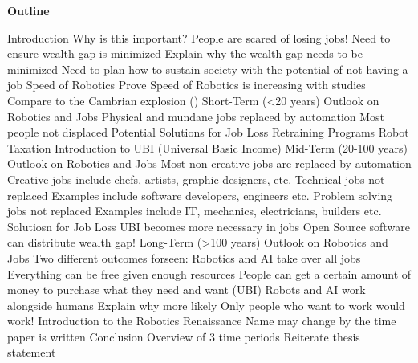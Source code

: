 \documentclass[12pt,letterpaper,man,natbib]{apa6}
\begin{document}
    \pagebreak
    \textbf{Outline}
    \begin{outline}[enumerate]
        \1 Introduction
            \2 Why is this important?
                \3 People are scared of losing jobs!
                \3 Need to ensure wealth gap is minimized
                    \4 Explain why the wealth gap needs to be minimized
                \3 Need to plan how to sustain society with the potential of not having a job
            \2 Speed of Robotics
                \3 Prove Speed of Robotics is increasing with studies
                \3 Compare to the Cambrian explosion (\cite{Cambrian})
        \1 Short-Term (<20 years)
            \2 Outlook on Robotics and Jobs
                \3 Physical and mundane jobs replaced by automation
                \3 Most people not displaced
            \2 Potential Solutions for Job Loss
                \3 Retraining Programs
                \3 Robot Taxation
                \3 Introduction to UBI (Universal Basic Income)
        \1 Mid-Term (20-100 years)
            \2 Outlook on Robotics and Jobs 
                \3 Most non-creative jobs are replaced by automation
                    \4 Creative jobs include chefs, artists, graphic designers, etc.
                \3 Technical jobs not replaced
                    \4 Examples include software developers, engineers etc.
                \3 Problem solving jobs not replaced
                    \4 Examples include IT, mechanics, electricians, builders etc.
            \2 Solutiosn for Job Loss
                \3 UBI becomes more necessary in jobs
                \3 Open Source software can distribute wealth gap!
        \1 Long-Term (>100 years)
            \2 Outlook on Robotics and Jobs
                \3 Two different outcomes forseen:
                \3 Robotics and AI take over all jobs
                    \4 Everything can be free given enough resources
                    \4 People can get a certain amount of money to purchase what they need and want (UBI)
                \3 Robots and AI work alongside humans
                    \4 Explain why more likely
                    \4 Only people who want to work would work!
            \2 Introduction to the Robotics Renaissance
                \3 Name may change by the time paper is written
        \1 Conclusion
            \2 Overview of 3 time periods
            \2 Reiterate thesis statement
    \end{outline}

    
\end{document}
